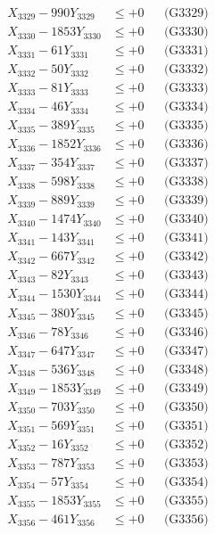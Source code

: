 \documentclass[a4paper,10pt]{article}
\begin{document}
{\begin{align}
X_{3329} - 990Y_{3329} &\leq +0 && \text{(G3329)} \\
X_{3330} - 1853Y_{3330} &\leq +0 && \text{(G3330)} \\
\allowbreak
X_{3331} - 61Y_{3331} &\leq +0 && \text{(G3331)} \\
X_{3332} - 50Y_{3332} &\leq +0 && \text{(G3332)} \\
X_{3333} - 81Y_{3333} &\leq +0 && \text{(G3333)} \\
X_{3334} - 46Y_{3334} &\leq +0 && \text{(G3334)} \\
X_{3335} - 389Y_{3335} &\leq +0 && \text{(G3335)} \\
X_{3336} - 1852Y_{3336} &\leq +0 && \text{(G3336)} \\
X_{3337} - 354Y_{3337} &\leq +0 && \text{(G3337)} \\
X_{3338} - 598Y_{3338} &\leq +0 && \text{(G3338)} \\
X_{3339} - 889Y_{3339} &\leq +0 && \text{(G3339)} \\
X_{3340} - 1474Y_{3340} &\leq +0 && \text{(G3340)} \\
\allowbreak
X_{3341} - 143Y_{3341} &\leq +0 && \text{(G3341)} \\
X_{3342} - 667Y_{3342} &\leq +0 && \text{(G3342)} \\
X_{3343} - 82Y_{3343} &\leq +0 && \text{(G3343)} \\
X_{3344} - 1530Y_{3344} &\leq +0 && \text{(G3344)} \\
X_{3345} - 380Y_{3345} &\leq +0 && \text{(G3345)} \\
X_{3346} - 78Y_{3346} &\leq +0 && \text{(G3346)} \\
X_{3347} - 647Y_{3347} &\leq +0 && \text{(G3347)} \\
X_{3348} - 536Y_{3348} &\leq +0 && \text{(G3348)} \\
X_{3349} - 1853Y_{3349} &\leq +0 && \text{(G3349)} \\
X_{3350} - 703Y_{3350} &\leq +0 && \text{(G3350)} \\
\allowbreak
X_{3351} - 569Y_{3351} &\leq +0 && \text{(G3351)} \\
X_{3352} - 16Y_{3352} &\leq +0 && \text{(G3352)} \\
X_{3353} - 787Y_{3353} &\leq +0 && \text{(G3353)} \\
X_{3354} - 57Y_{3354} &\leq +0 && \text{(G3354)} \\
X_{3355} - 1853Y_{3355} &\leq +0 && \text{(G3355)} \\
X_{3356} - 461Y_{3356} &\leq +0 && \text{(G3356)} \\

\end{align}}
\end{document}
